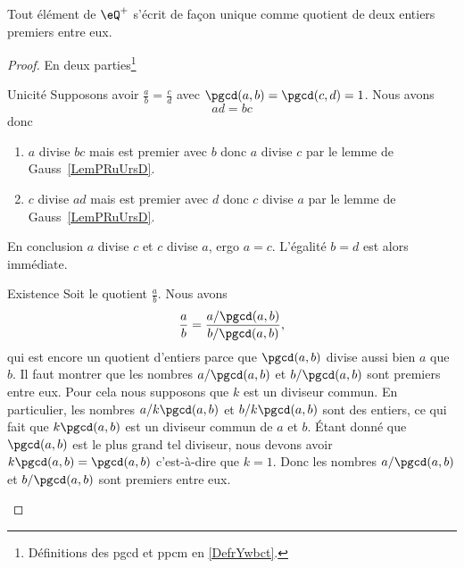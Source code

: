 \begin{theorem}     \label{THOooWYQVooRBaAAM}
    Tout élément de \( \eQ^+\) s'écrit de façon unique comme quotient de deux entiers premiers entre eux.
\end{theorem}

\begin{proof}
    En deux parties\footnote{Définitions des pgcd et ppcm en \ref{DefrYwbct}.}
    \begin{subproof}
        \item[Unicité]
            Supposons avoir \( \frac{ a }{ b }=\frac{ c }{ d }\) avec \( \pgcd(a,b)=\pgcd(c,d)=1\). Nous avons
            \begin{equation}
                ad=bc
            \end{equation}
            donc
            \begin{enumerate}
                \item
                    \( a\) divise \( bc\) mais est premier avec \( b\) donc \( a\) divise \( c\) par le lemme de Gauss~\ref{LemPRuUrsD}.
                \item
                    \( c\) divise \( ad\) mais est premier avec \( d\) donc \( c\) divise \( a\) par le lemme de Gauss~\ref{LemPRuUrsD}.
            \end{enumerate}
            En conclusion \( a\) divise \( c\) et \( c\) divise \( a\), ergo \( a=c\). L'égalité \( b=d\) est alors immédiate.
        \item[Existence]
            Soit le quotient \( \frac{ a }{ b }\). Nous avons
            \begin{equation}
                \frac{ a }{ b }=\frac{ a/\pgcd(a,b) }{ b/\pgcd(a,b) },
            \end{equation}
            qui est encore un quotient d'entiers parce que \( \pgcd(a,b)\) divise aussi bien \( a\) que \( b\). Il faut montrer que les nombres \( a/\pgcd(a,b)\) et \( b/\pgcd(a,b)\) sont premiers entre eux. Pour cela nous supposons que \( k\) est un diviseur commun. En particulier, les nombres \( a/k\pgcd(a,b)\) et \( b/k\pgcd(a,b)\) sont des entiers, ce qui fait que \( k\pgcd(a,b)\) est un diviseur commun de \( a\) et \( b\). Étant donné que \( \pgcd(a,b)\) est le plus grand tel diviseur, nous devons avoir \( k\pgcd(a,b)=\pgcd(a,b)\) c'est-à-dire que \( k=1\). Donc les nombres \( a/\pgcd(a,b)\) et \( b/\pgcd(a,b)\) sont premiers entre eux.
    \end{subproof}
\end{proof}

